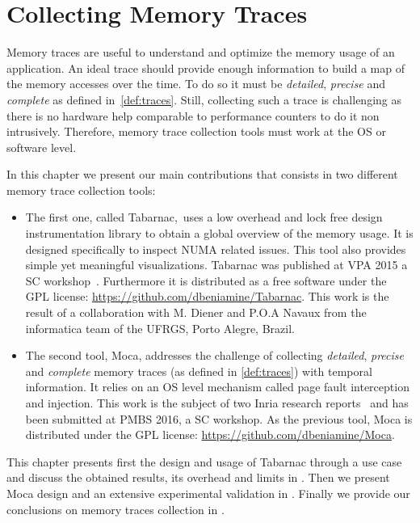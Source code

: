 \chapter{Collecting Memory Traces}

Memory traces are useful to understand and optimize the memory usage of an application.
An ideal trace should provide enough information to build a map of the memory accesses over the time.
To do so it must be \emph{detailed}, \emph{precise} and \emph{complete} as defined in~\ref{def:traces}.
Still, collecting such a trace is challenging as there is no hardware help comparable to performance counters to do it non intrusively.
Therefore, memory trace collection tools must work at the \gls{OS} or software level.

In this chapter we present our main contributions that consists in two different memory trace collection tools:
\begin{itemize}
    \item The first one, called \gls{Tabarnac}, uses a low overhead and lock free design instrumentation library to obtain a global overview of the memory usage.
        It is designed specifically to inspect \gls{NUMA} related issues.
        This tool also provides simple yet meaningful visualizations.
        \gls{Tabarnac} was published at \gls{VPA} 2015 a \gls{SC} workshop~\cite{Beniamine15TABARNAC}.
        Furthermore it is distributed as a free software under the \gls{GPL} license: \url{https://github.com/dbeniamine/Tabarnac}.
        This work is the result of a collaboration with M. Diener and P.O.A Navaux from the informatica team of the \gls{UFRGS}, Porto Alegre, Brazil.
    \item The second tool, \gls{Moca}, addresses the challenge of collecting \emph{detailed}, \emph{precise} and \emph{complete} memory traces (as defined in \ref{def:traces}) with temporal information.
        It relies on an \gls{OS} level mechanism called page fault interception and injection.
        This work is the subject of two Inria research reports~\cite{Beniamine15Memory,Beniamine16Moca} and has been submitted at \gls{PMBS} 2016, a \gls{SC} workshop.
        As the previous tool, \gls{Moca} is distributed under the \gls{GPL} license: \url{https://github.com/dbeniamine/Moca}.
\end{itemize}

This chapter presents first the design and usage of \gls{Tabarnac} through a use case and discuss the obtained results, its overhead and limits in .
Then we present \gls{Moca} design and an extensive experimental validation in .
Finally we provide our conclusions on memory traces collection in .


